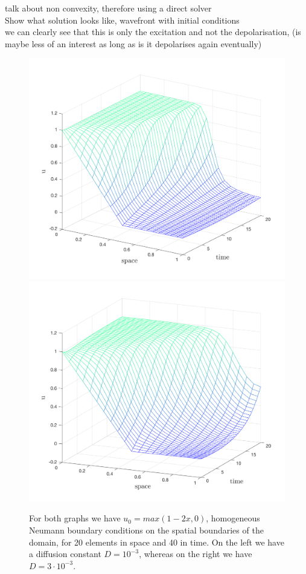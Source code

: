 \documentclass[../draft_1.tex]{subfiles}
\begin{document}
talk about non convexity, therefore using a direct solver \\
Show what solution looks like, wavefront with initial conditions \\
we can clearly see that this is only the excitation and not the depolarisation, (is maybe less of an interest as long as is it depolarises again eventually)
\begin{figure}[ht!]
	\centering
	\includegraphics[scale=0.3]{images/implementation/sol_d0_001_1by20_20by40elem}
	\includegraphics[scale=0.3]{images/implementation/sol_d0_003_1by20_20by40elem}
	\caption{For both graphs we have $u_0 = max(1-2x, 0)$, homogeneous Neumann boundary conditions on the spatial boundaries of the domain, for 20 elements in space and 40 in time. On the left we have a diffusion constant $D= 10^{-3}$, whereas on the right we have $D=3 \cdot 10^{-3}$.}
\end{figure}
\end{document}
